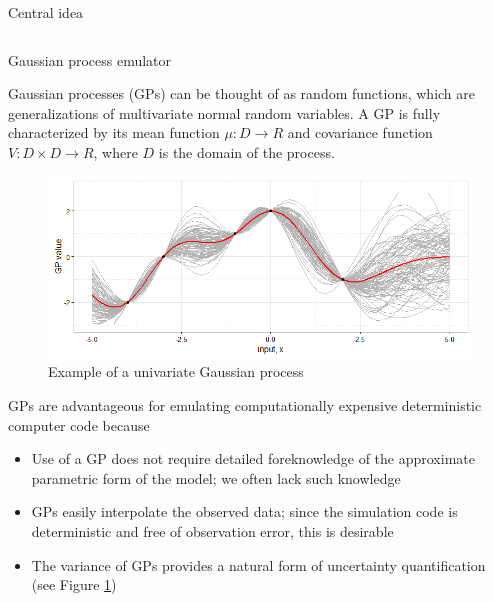 \documentclass[final]{beamer}
\newlength{\onecolwid}
\newlength{\twocolwid}
\begin{document}
\begin{frame}[t]
\begin{columns}[t]
\begin{column}{\twocolwid}
\begin{alertblock}{Central idea}
\end{alertblock} 


\begin{columns}[t,totalwidth=\twocolwid] %

\begin{column}{\onecolwid}\vspace{-.6in} %


\begin{alertblock}{Gaussian process emulator}

Gaussian processes (GPs) can be thought of as random functions, which are generalizations of multivariate normal random variables. A GP is fully characterized by its mean function $\mu:D\to R$ and covariance function $V:D\times D\to R$, where $D$ is the domain of the process.

\begin{figure}[h!]
\includegraphics[width=0.95\linewidth]{../../gp_example}
\caption{Example of a univariate Gaussian process}
\label{gp_ex}
\end{figure}



GPs are advantageous for emulating computationally expensive deterministic computer code because 
\begin{itemize}
\item Use of a GP does not require detailed foreknowledge of the approximate parametric form of the model; we often lack such knowledge
\item GPs easily interpolate the observed data; since the simulation code is deterministic and free of observation error, this is desirable
\item The variance of GPs provides a natural form of uncertainty quantification (see Figure \ref{gp_ex})
\end{itemize}




\end{alertblock}
\end{column}
\end{columns}
\end{column}
\end{columns}
\end{frame}
\end{document}

